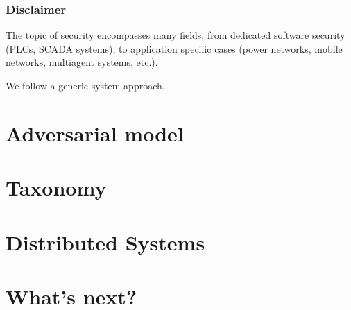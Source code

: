 \documentclass[presentation]{beamer}
\begin{document}
\begin{frame}
	\frametitle{Disclaimer}

	The topic of security encompasses many fields, from dedicated software security (PLCs, SCADA systems), to application specific cases (power networks, mobile networks, multiagent systems, etc.).

	\vfill
	We follow a generic system approach.
\end{frame}


\section{Adversarial model}

\section{Taxonomy}

\section{Distributed Systems}

\section{What's next?}

 
\end{document}
